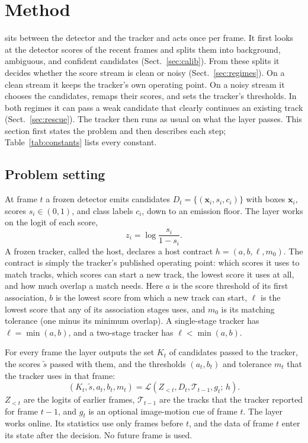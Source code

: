 \section{Method}\label{sec:method}

\scl{} sits between the detector and the tracker and acts once per frame. It
first looks at the detector scores of the recent frames and splits them into
background, ambiguous, and confident candidates (Sect.~\ref{sec:calib}). From
these splits it decides whether the score stream is clean or noisy
(Sect.~\ref{sec:regimes}). On a clean stream it keeps the tracker's own
operating point. On a noisy stream it chooses the candidates, remaps their
scores, and sets the tracker's thresholds. In both regimes it can pass a weak
candidate that clearly continues an existing track (Sect.~\ref{sec:rescue}).
The tracker then runs as usual on what the layer passes. This section first
states the problem and then describes each step; Table~\ref{tab:constants}
lists every constant.

\subsection{Problem setting}\label{sec:problem}
At frame $t$ a frozen detector emits candidates $D_t=\{(\mathbf{x}_i,s_i,c_i)\}$
with boxes $\mathbf{x}_i$, scores $s_i\in(0,1)$, and class labels $c_i$, down
to an emission floor. The layer works on the logit of each score,
\begin{equation}
z_i=\log\frac{s_i}{1-s_i}.
\label{eq:logit}
\end{equation}
A frozen tracker, called the host, declares a host contract
$h=(a,b,\ell,m_0)$. The contract is simply the tracker's published operating
point: which scores it uses to match tracks, which scores can start a new
track, the lowest score it uses at all, and how much overlap a match needs.
Here $a$ is the score threshold of its first association,
$b$ is the lowest score from which a new track can start, $\ell$ is the lowest
score that any of its association stages uses, and $m_0$ is its matching
tolerance (one minus its minimum overlap). A single-stage tracker has
$\ell=\min(a,b)$, and a two-stage tracker has $\ell<\min(a,b)$.

For every frame the layer outputs the set $K_t$ of candidates passed to the
tracker, the scores $\tilde{s}$ passed with them, and the thresholds
$(a_t,b_t)$ and tolerance $m_t$ that the tracker uses in that frame:
\begin{equation}
\left(K_t,\tilde{s},a_t,b_t,m_t\right)=
\mathcal{L}\left(Z_{<t},D_t,\mathcal{T}_{t-1},g_t;\,h\right).
\label{eq:layer}
\end{equation}
$Z_{<t}$ are the logits of earlier frames, $\mathcal{T}_{t-1}$ are the
tracks that the tracker reported for frame $t-1$, and $g_t$ is an optional
image-motion cue of frame $t$. The layer works online. Its statistics use only
frames before $t$, and the data of frame $t$ enter its state after the
decision. No future frame is used.

